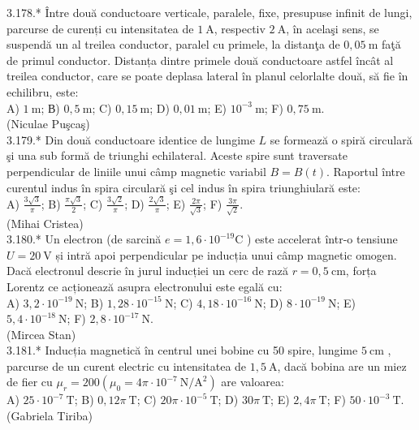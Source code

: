 \documentclass[10pt]{article}
\begin{document}
3.178.* Între două conductoare verticale, paralele, fixe, presupuse infinit de lungi, parcurse de curenți cu intensitatea de $1 \mathrm{~A}$, respectiv $2 \mathrm{~A}$, în acelaşi sens, se suspendă un al treilea conductor, paralel cu primele, la distanţa de $0,05 \mathrm{~m}$ faţă de primul conductor. Distanța dintre primele două conductoare astfel încât al treilea conductor, care se poate deplasa lateral în planul celorlalte două, să fie în echilibru, este:\\ A) $1 \mathrm{~m}$; В) $0,5 \mathrm{~m}$; C) $0,15 \mathrm{~m}$; D) $0,01 \mathrm{~m}$; E) $10^{-3} \mathrm{~m}$; F) $0,75 \mathrm{~m}$.\\ (Niculae Puşcaş)\\

3.179.* Din două conductoare identice de lungime $L$ se formează o spiră circulară şi una sub formă de triunghi echilateral. Aceste spire sunt traversate perpendicular de liniile unui câmp magnetic variabil $B=B(t)$. Raportul între curentul indus în spira circulară şi cel indus în spira triunghiulară este:\\ A) $\frac{3 \sqrt{3}}{\pi}$; B) $\frac{\pi \sqrt{3}}{2}$; C) $\frac{3 \sqrt{2}}{\pi}$; D) $\frac{2 \sqrt{3}}{\pi}$; E) $\frac{2 \pi}{\sqrt{3}}$; F) $\frac{3 \pi}{\sqrt{2}}$.\\ (Mihai Cristea)\\

3.180.* Un electron (de sarcină $e=1,6 \cdot 10^{-19} \mathrm{C}$ ) este accelerat într-o tensiune $U=20 \mathrm{~V}$ și intră apoi perpendicular pe inducția unui câmp magnetic omogen. Dacă electronul descrie în jurul inducției un cerc de rază $r=0,5 \mathrm{~cm}$, forța Lorentz ce acționează asupra electronului este egală cu:\\ A) $3,2 \cdot 10^{-19} \mathrm{~N}$; B) $1,28 \cdot 10^{-15} \mathrm{~N}$; C) $4,18 \cdot 10^{-16} \mathrm{~N}$; D) $8 \cdot 10^{-19} \mathrm{~N}$; E) $5,4 \cdot 10^{-18} \mathrm{~N}$; F) $2,8 \cdot 10^{-17} \mathrm{~N}$.\\ (Mircea Stan)\\

3.181.* Inducția magnetică în centrul unei bobine cu 50 spire, lungime $5 \mathrm{~cm}$ , parcurse de un curent electric cu intensitatea de $1,5 \mathrm{~A}$, dacă bobina are un miez de fier cu $\mu_{r}=200\left(\mu_{0}=4 \pi \cdot 10^{-7} \mathrm{~N} / \mathrm{A}^{2}\right)$ are valoarea:\\ A) $25 \cdot 10^{-7} \mathrm{~T}$; B) $0,12 \pi \mathrm{~T}$; C) $20 \pi \cdot 10^{-5} \mathrm{~T}$; D) $30 \pi \mathrm{~T}$; E) $2,4 \pi \mathrm{~T}$; F) $50 \cdot 10^{-3} \mathrm{~T}$.\\ (Gabriela Tiriba)\\
\end{document}
